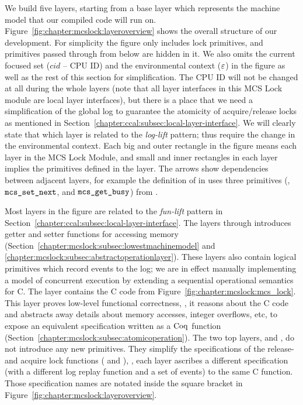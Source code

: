 We build five layers, starting from a base
layer which represents the machine model that our compiled code will
run on.
Figure~\ref{fig:chapter:mcslock:layeroverview} shows the overall structure of our development.
For simplicity the figure only includes lock primitives, and
primitives passed through from below are hidden in it.
We also omits the current focused set ($cid$ -- CPU ID) and the environmental context (${\varepsilon}$) in the figure
as well as the rest of this section for simplification.
The CPU ID will not be changed at all during the whole layers (note that all  layer interfaces in this MCS Lock module 
are local layer interfaces), but there is a place that we need a simplification of the global log to guarantee the atomicity of 
acquire/release locks as mentioned in Section~\ref{chapter:ccal:subsec:local-layer-interface}.
We will clearly state that which layer is related to the \textit{log-lift} pattern; 
thus require the change in the environmental context.
Each big and outer rectangle in the figure means each layer in the MCS Lock Module, 
and small and inner rectangles in each layer implies the primitives defined in the layer.
The arrows show dependencies between adjacent layers,
for example the definition of  in 
uses three primitives (,
${\mathrm{\texttt{mcs$\_$set$\_$next}}}$, and ${\mathrm{\texttt{mcs$\_$get$\_$busy}}}$) from  .

Most layers in the figure are related to the \textit{fun-lift} pattern in Section~\ref{chapter:ccal:subsec:local-layer-interface}.
The layers  through 
introduces getter and setter functions for accessing memory
(Section~\ref{chapter:mcslock:subsec:lowestmachinemodel} and
\ref{chapter:mcslock:subsec:abstractoperationlayer}). These layers also
contain logical primitives which record events to the log; we are in
effect manually implementing a model of concurrent execution by
extending a sequential operational semantics for C. 
The layer  contains the C code from 
Figure~\ref{fig:chapter:mcslock:mcs_lock}. This layer proves low-level
functional correctness, \ie, it reasons about the C code and
abstracts away details about memory accesses, integer overflows, etc,
to expose an equivalent specification written as a $\mathrm{Coq}$
function (Section~\ref{chapter:mcslock:subsec:atomicoperation}).
The two top layers,  and , do not introduce any new primitives.
They simplify the specifications of 
the release- and acquire lock functions ( and
), \ie, each layer ascribes a different
specification (with a different log replay function and a set of events)
to the same C function. Those specification names are notated inside the square bracket in Figure~\ref{fig:chapter:mcslock:layeroverview}.

